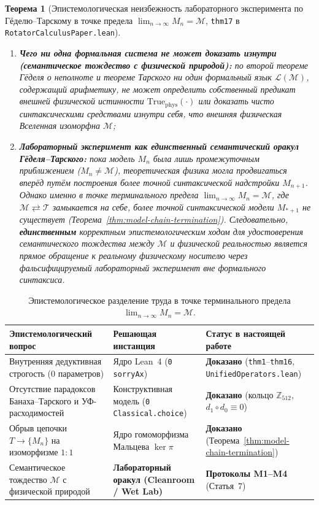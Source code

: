 \documentclass[11pt,a4paper]{article}
\newtheorem{theorem}{Теорема}[section]
\theoremstyle{definition}
\theoremstyle{remark}
\begin{document}
\begin{theorem}[Эпистемологическая неизбежность лабораторного эксперимента по Гёделю--Тарскому в точке предела $\lim_{n\to\infty} M_n = \mathcal{M}$, \texttt{thm17} в \texttt{RotatorCalculusPaper.lean}]
\begin{enumerate}[label=\textbf{(\roman*)},leftmargin=*]
\item \textbf{Чего ни одна формальная система не может доказать изнутри (семантическое тождество с физической природой):}
  по второй теореме Гёделя о неполноте и теореме Тарского ни один формальный язык $\mathcal{L}(\mathcal{M})$, содержащий арифметику, не может определить собственный предикат внешней физической истинности $\mathrm{True}_{\mathrm{phys}}(\cdot)$ или доказать чисто синтаксическими средствами изнутри себя, что внешняя физическая Вселенная изоморфна $\mathcal{M}$;
\item \textbf{Лабораторный эксперимент как единственный семантический оракул Гёделя--Тарского:}
  пока модель $M_n$ была лишь промежуточным приближением ($M_n \ne \mathcal{M}$), теоретическая физика могла продвигаться вперёд путём построения более точной синтаксической надстройки $M_{n+1}$. Однако именно в точке терминального предела $\lim_{n\to\infty} M_n = \mathcal{M}$, где $\mathcal{M}\rightleftarrows\mathcal{T}$ замыкается на себе, более точной синтаксической модели $M_{*+1}$ не существует (Теорема~\ref{thm:model-chain-termination}). Следовательно, \textbf{единственным} корректным эпистемологическим ходом для удостоверения семантического тождества между $\mathcal{M}$ и физической реальностью является прямое обращение к реальному физическому носителю через фальсифицируемый лабораторный эксперимент вне формального синтаксиса.
\end{enumerate}
\end{theorem}

\begin{table}[htbp]
\centering
\caption{Эпистемологическое разделение труда в точке терминального предела $\lim_{n\to\infty} M_n = \mathcal{M}$.}
\label{tab:epistemological-division}
\small
\begin{tabular}{@{}lll@{}}
\toprule
\textbf{Эпистемологический вопрос} & \textbf{Решающая инстанция} & \textbf{Статус в настоящей работе} \\
\midrule
Внутренняя дедуктивная строгость ($0$ параметров) & Ядро Lean~4 (\texttt{0 sorryAx}) & \textbf{Доказано} (\texttt{thm1}--\texttt{thm16}, \texttt{UnifiedOperators.lean}) \\
Отсутствие парадоксов Банаха--Тарского и УФ-расходимостей & Конструктивная модель (\texttt{0 Classical.choice}) & \textbf{Доказано} (кольцо $\mathbb{Z}_{512}$, $d_1\circ d_0\equiv 0$) \\
Обрыв цепочки $T\to\{M_n\}$ на изоморфизме $1:1$ & Ядро гомоморфизма Мальцева $\ker\pi$ & \textbf{Доказано} (Теорема~\ref{thm:model-chain-termination}) \\
Семантическое тождество $\mathcal{M}$ с физической природой & \textbf{Лабораторный оракул (Cleanroom / Wet Lab)} & \textbf{Протоколы M1--M4} (Статья~7) \\
\bottomrule
\end{tabular}
\end{table}
\end{document}
